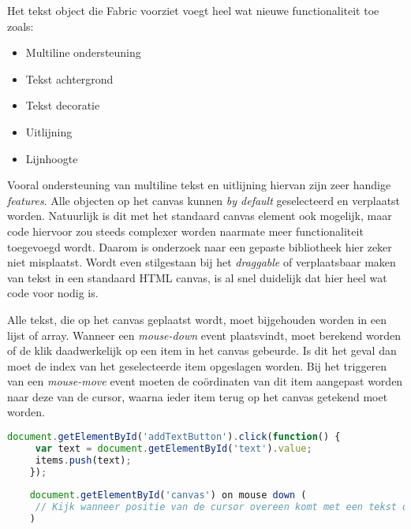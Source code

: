 Het tekst object die Fabric voorziet voegt heel wat nieuwe functionaliteit toe zoals: 

\begin{itemize}
	\item Multiline ondersteuning
	\item Tekst achtergrond
	\item Tekst decoratie
	\item Uitlijning
	\item Lijnhoogte
\end{itemize}

Vooral ondersteuning van multiline tekst en uitlijning hiervan zijn zeer handige \textit{features}. Alle objecten op het canvas kunnen \textit{by default} geselecteerd en verplaatst worden. Natuurlijk is dit met het standaard canvas element ook mogelijk, maar code hiervoor zou steeds complexer worden naarmate meer functionaliteit toegevoegd wordt. Daarom is onderzoek naar een gepaste bibliotheek hier zeker niet misplaatst. Wordt even stilgestaan bij het \textit{draggable} of verplaatsbaar maken van tekst in een standaard HTML canvas, is al snel duidelijk dat hier heel wat code voor nodig is. 

Alle tekst, die op het canvas geplaatst wordt, moet bijgehouden worden in een lijst of array. Wanneer een \textit{mouse-down} event plaatsvindt, moet berekend worden of de klik daadwerkelijk op een item in het canvas gebeurde. Is dit het geval dan moet de index van het geselecteerde item opgeslagen worden. Bij het triggeren van een \textit{mouse-move} event moeten de co\"{o}rdinaten van dit item aangepast worden naar deze van de cursor, waarna ieder item terug op het canvas getekend moet worden. 

\begin{lstlisting}[language=javascript]
	document.getElementById('addTextButton').click(function() {
	 var text = document.getElementById('text').value;
	 items.push(text);
	});
	
	document.getElementById('canvas') on mouse down (
	 // Kijk wanneer positie van de cursor overeen komt met een tekst object
	)
\end{lstlisting}

